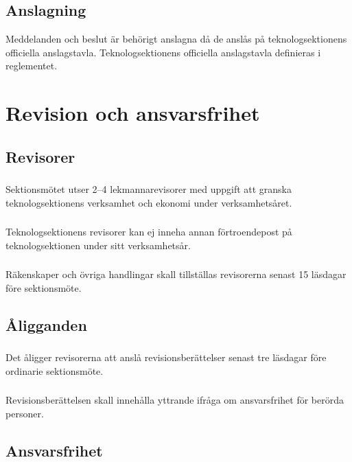 \documentclass[a4paper]{dtek}
\begin{document}
\subsection{Anslagning}
Meddelanden och beslut är behörigt anslagna då de anslås på teknologsektionens
officiella anslagstavla. Teknologsektionens officiella anslagstavla definieras i
reglementet.
\newpage

\section{Revision och ansvarsfrihet}
\subsection{Revisorer}
\subsubsection{}
Sektionsmötet utser 2–4 lekmannarevisorer med uppgift att granska teknologsektionens verksamhet och ekonomi under verksamhetsåret.
\subsubsection{}
Teknologsektionens revisorer kan ej inneha annan förtroendepost på teknologsektionen under sitt verksamhetsår.
\subsubsection{}
Räkenskaper och övriga handlingar skall tillställas revisorerna senast 15 läsdagar före sektionsmöte.
\subsection{Åligganden}
\subsubsection{}
Det åligger revisorerna att anslå revisionsberättelser senast tre läsdagar före
ordinarie sektionsmöte.
\subsubsection{}
Revisionsberättelsen skall innehålla yttrande ifråga om ansvarsfrihet för berörda personer.
\subsection{Ansvarsfrihet}
\end{document}
